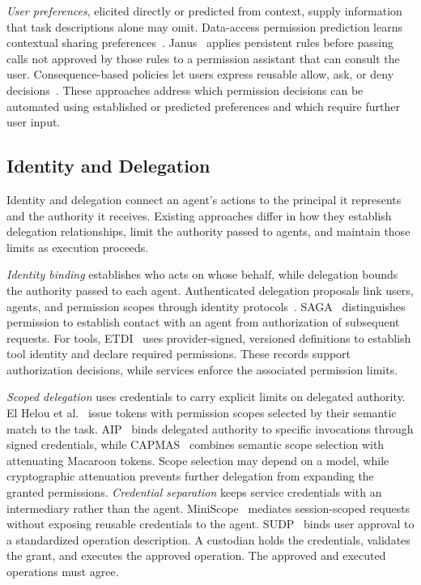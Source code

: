 \emph{User preferences}, elicited directly or predicted from context, supply information that task descriptions alone may omit. Data-access permission prediction learns contextual sharing preferences~\cite{dataperms}. Janus~\cite{janus} applies persistent rules before passing calls not approved by those rules to a permission assistant that can consult the user. Consequence-based policies let users express reusable allow, ask, or deny decisions~\cite{userpolicies}. These approaches address which permission decisions can be automated using established or predicted preferences and which require further user input.

\subsection{Identity and Delegation}
Identity and delegation connect an agent's actions to the principal it represents and the authority it receives. Existing approaches differ in how they establish delegation relationships, limit the authority passed to agents, and maintain those limits as execution proceeds.

\emph{Identity binding} establishes who acts on whose behalf, while delegation bounds the authority passed to each agent. Authenticated delegation proposals link users, agents, and permission scopes through identity protocols~\cite{delegation}. SAGA~\cite{saga} distinguishes permission to establish contact with an agent from authorization of subsequent requests. For tools, ETDI~\cite{etdi} uses provider-signed, versioned definitions to establish tool identity and declare required permissions. These records support authorization decisions, while services enforce the associated permission limits.

\emph{Scoped delegation} uses credentials to carry explicit limits on delegated authority. El Helou et al.~\cite{astra} issue tokens with permission scopes selected by their semantic match to the task. AIP~\cite{aip} binds delegated authority to specific invocations through signed credentials, while CAPMAS~\cite{capmas} combines semantic scope selection with attenuating Macaroon tokens. Scope selection may depend on a model, while cryptographic attenuation prevents further delegation from expanding the granted permissions. \emph{Credential separation} keeps service credentials with an intermediary rather than the agent. MiniScope~\cite{miniscope} mediates session-scoped requests without exposing reusable credentials to the agent. SUDP~\cite{sudp} binds user approval to a standardized operation description. A custodian holds the credentials, validates the grant, and executes the approved operation. The approved and executed operations must agree.

